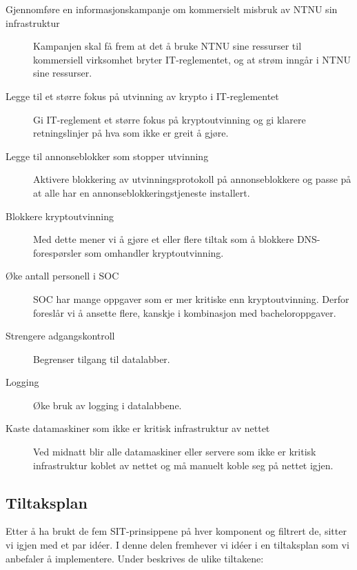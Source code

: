 \begin{description}
\item[Gjennomføre en informasjonskampanje om kommersielt misbruk av NTNU sin infrastruktur] Kampanjen skal få frem at det å bruke NTNU sine ressurser til kommersiell virksomhet bryter IT-reglementet, og at strøm inngår i NTNU sine ressurser.
\item[Legge til et større fokus på utvinning av krypto i IT-reglementet] Gi IT-reglement et større fokus på kryptoutvinning og gi klarere retningslinjer på hva som ikke er greit å gjøre.
\item[Legge til annonseblokker som stopper utvinning] Aktivere blokkering av utvinningsprotokoll på annonseblokkere og passe på at alle har en annonseblokkeringstjeneste installert.
\item[Blokkere kryptoutvinning] Med dette mener vi å gjøre et eller flere tiltak som å blokkere DNS-forespørsler som omhandler kryptoutvinning.  
\item[Øke antall personell i SOC] SOC har mange oppgaver som er mer kritiske enn kryptoutvinning. Derfor foreslår vi å ansette flere, kanskje i kombinasjon med bacheloroppgaver.
\item[Strengere adgangskontroll] Begrenser tilgang til datalabber. 
\item[Logging] Øke bruk av logging i datalabbene. 
\item[Kaste datamaskiner som ikke er kritisk infrastruktur av nettet] Ved midnatt blir alle datamaskiner eller servere som ikke er kritisk infrastruktur koblet av nettet og må manuelt koble seg på nettet igjen.
\end{description}

\subsection{Tiltaksplan}
Etter å ha brukt de fem SIT-prinsippene på hver komponent og filtrert de, sitter vi igjen med et par idéer. I denne delen fremhever vi idéer i en tiltaksplan som vi anbefaler å implementere. 
Under beskrives de ulike tiltakene:

